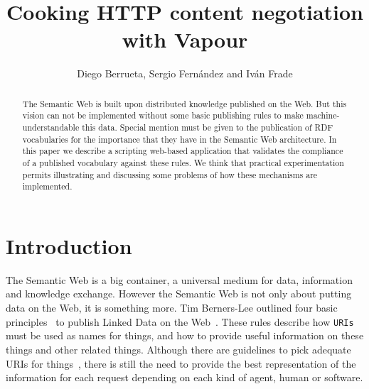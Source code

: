 \documentclass{../templates/llncs}
\begin{document}
\title{Cooking HTTP content negotiation with Vapour} %

\author{Diego Berrueta, Sergio Fern\'andez and Iv\'an Frade}


\maketitle

\begin{abstract}
The Semantic Web is built upon distributed knowledge published on 
the Web. But this vision can not be implemented without some basic publishing
rules to make machine-understandable this data. Special mention must be 
given to the publication of RDF vocabularies for the importance that they have 
in the Semantic Web architecture. In this paper we describe a scripting 
web-based application that validates the compliance of a published vocabulary 
against these rules. We think that practical experimentation permits 
illustrating and discussing some problems of how these mechanisms are
implemented.
\end{abstract}

\section{Introduction}

The Semantic Web is a big container, a universal medium for data, information
and knowledge exchange. However the Semantic Web is not only about putting data on
the Web, it is something more. Tim Berners-Lee outlined four basic 
principles~\cite{TimBL2006} to publish Linked Data on the Web~\cite{PublishLinkedData2007}.
These rules describe how \texttt{URIs} must be used as names for things, 
and how to provide useful information on these things and other related 
things. Although there are guidelines to pick adequate URIs for 
things~\cite{Sauermann2007}, there is still the need to provide the best 
representation of the information for each request depending on each kind 
of agent, human or software.
\end{document}

